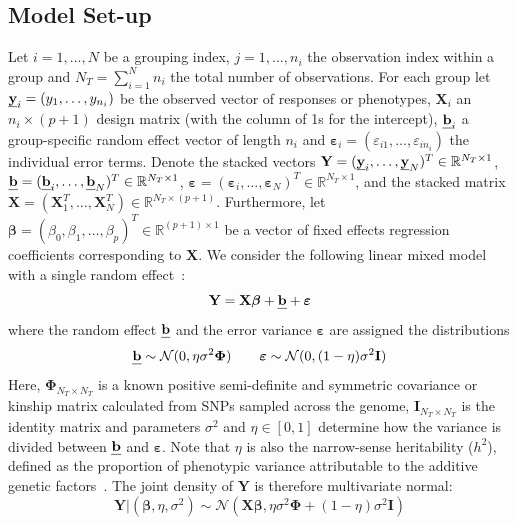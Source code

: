 \documentclass[12pt,letter]{article}\usepackage[]{graphicx}\usepackage[]{color}
\newcommand{\by}{\textbf{\emph{y}}}
\newcommand{\bX}{\textbf{X}}
\newcommand{\bY}{\textbf{Y}}
\newcommand{\bb}{\textbf{\emph{b}}}
\newcommand{\bI}{\textbf{I}}
\newcommand{\be}{\boldsymbol{\varepsilon}}
\newcommand{\bbeta}{\boldsymbol{\beta}}
\newcommand{\bPhi}{\boldsymbol{\Phi}}
\begin{document}



\subsection{Model Set-up}

Let $i = 1, \ldots, N$ be a grouping index, $j = 1, \ldots, n_i$ the observation index within a group and $N_T = \sum_{i=1}^{N} n_i$ the total number of observations. For each group let \mbox{$\by_i = (y_1, \ldots, y_{n_i})$} be the observed vector of responses or phenotypes, $\bX_i$ an $n_i \times (p + 1)$ design matrix (with the column of 1s for the intercept), $\bb_i$ a group-specific random effect vector of length $n_i$ and \mbox{$\be_i = (\varepsilon_{i1}, \ldots, \varepsilon_{in_i})$} the individual error terms. Denote the stacked vectors $\bY = (\by_i, \ldots, \by_N)^T \in \mathbb{R}^{N_T \times 1}$, $\bb = (\bb_i, \ldots, \bb_N)^T \in \mathbb{R}^{N_T \times 1}$, \mbox{$\be = (\be_i, \ldots, \be_N)^T \in \mathbb{R}^{N_T \times 1}$}, and the stacked matrix \\\mbox{$\bX = (\bX_1^T, \ldots, \bX_N^T) \in \mathbb{R}^{N_T \times (p + 1)}$}. Furthermore, let $\bbeta = (\beta_0,\beta_1, \ldots, \beta_p)^T \in \mathbb{R}^{(p+1) \times 1}$ be a vector of fixed effects regression coefficients corresponding to $\bX$. We consider the following linear mixed model with a single random effect~\citep{pirinen2013efficient}:
\begin{equation}
	\bY = \bX \bbeta + \bb + \be
\end{equation}
where the random effect $\bb$ and the error variance $\be$ are assigned the distributions
\begin{equation}
	\bb \sim \mathcal{N}(0, \eta \sigma^2 \bPhi) \qquad \be \sim \mathcal{N}(0, (1-\eta)\sigma^2 \bI)
\end{equation}
Here, $\bPhi_{N_T \times N_T}$ is a known positive semi-definite and symmetric covariance or kinship matrix calculated from SNPs sampled across the genome,   $\bI_{N_T \times N_T}$ is the identity matrix and parameters $\sigma^2$ and $\eta \in [0,1]$ determine how the variance is divided between $\bb$ and $\be$. Note that $\eta$ is also the narrow-sense heritability ($h^2$), defined as the proportion of phenotypic variance attributable to the additive genetic factors~\citep{manolio2009finding}. The joint density of $\bY$ is therefore multivariate normal:
\begin{equation}
	\bY | (\bbeta, \eta, \sigma^2) \sim \mathcal{N}(\bX \bbeta, \eta \sigma^2 \bPhi + (1-\eta)\sigma^2 \bI) \label{eq:prinen}
\end{equation}
\end{document}
